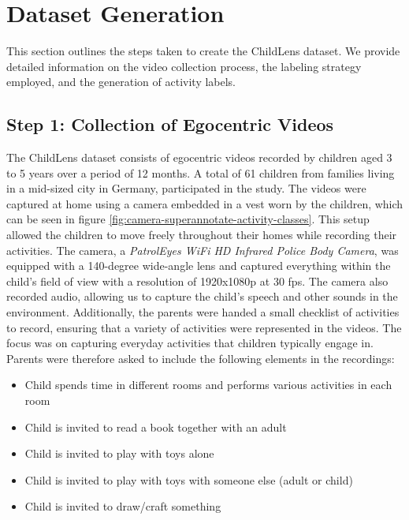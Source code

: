 \documentclass[
  man,floatsintext]{apa6}
\providecommand{\tightlist}{%
  \setlength{\itemsep}{0pt}\setlength{\parskip}{0pt}}
\begin{document}
\section{Dataset Generation}\label{dataset-generation}

This section outlines the steps taken to create the ChildLens dataset. We provide detailed information on the video collection process, the labeling strategy employed, and the generation of activity labels.

\subsection{Step 1: Collection of Egocentric Videos}\label{step-1-collection-of-egocentric-videos}

The ChildLens dataset consists of egocentric videos recorded by children aged 3 to 5 years over a period of 12 months. A total of 61 children from families living in a mid-sized city in Germany, participated in the study. The videos were captured at home using a camera embedded in a vest worn by the children, which can be seen in figure \ref{fig:camera-superannotate-activity-classes}. This setup allowed the children to move freely throughout their homes while recording their activities. The camera, a \emph{PatrolEyes WiFi HD Infrared Police Body Camera}, was equipped with a 140-degree wide-angle lens and captured everything within the child's field of view with a resolution of 1920x1080p at 30 fps. The camera also recorded audio, allowing us to capture the child's speech and other sounds in the environment. Additionally, the parents were handed a small checklist of activities to record, ensuring that a variety of activities were represented in the videos. The focus was on capturing everyday activities that children typically engage in. Parents were therefore asked to include the following elements in the recordings:

\begin{itemize}
\tightlist
\item
  Child spends time in different rooms and performs various activities in each room
\item
  Child is invited to read a book together with an adult
\item
  Child is invited to play with toys alone
\item
  Child is invited to play with toys with someone else (adult or child)
\item
  Child is invited to draw/craft something
\end{itemize}
\end{document}
